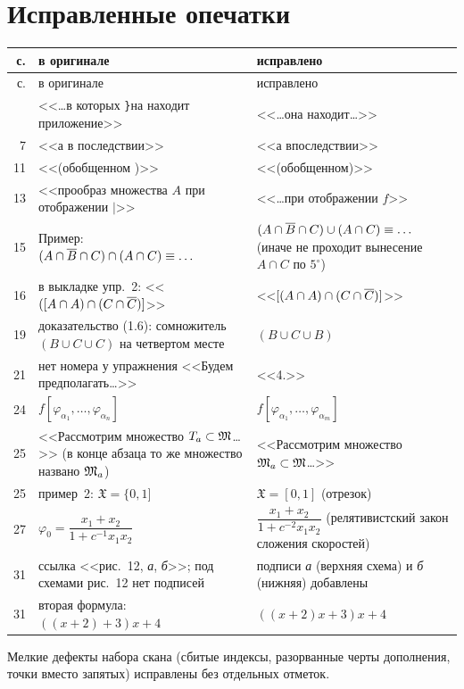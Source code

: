 \chapter{Исправленные опечатки}

{\small
\begin{longtable}{@{}r p{} p{}@{}}
\toprule
с. & в оригинале & исправлено\\ \midrule
\endfirsthead
\toprule
с. & в оригинале & исправлено\\ \midrule
\endhead
\bottomrule
\endlastfoot
3 & <<\dots в которых \texttt{\}}на находит приложение>> & <<\dots она находит\dots>>\\
7 & <<а в последствии>> & <<а впоследствии>>\\
11 & <<(обобщенном )>> & <<(обобщенном)>>\\
13 & <<прообраз множества $A$ при отображении $|$>> & <<\dots при отображении $f$>>\\
15 & Пример: $(A\cap\overline{B}\cap C)\cap(A\cap C)\equiv\dots$ & $(A\cap\overline{B}\cap C)\cup(A\cap C)\equiv\dots$ (иначе не проходит вынесение $A\cap C$ по $5^\circ$)\\
16 & в выкладке упр.~2: <<$([A\cap A)\cap(C\cap\overline{C})]$>> & <<$[(A\cap A)\cap(C\cap\overline{C})]$>>\\
19 & доказательство (1.6): сомножитель $(B\cup C\cup C)$ на четвертом месте & $(B\cup C\cup B)$\\
21 & нет номера у упражнения <<Будем предполагать\dots>> & <<4.>>\\
24 & $f[\varphi_{\alpha_1},\dots,\varphi_{\alpha_n}]$ & $f[\varphi_{\alpha_1},\dots,\varphi_{\alpha_m}]$\\
25 & <<Рассмотрим множество $T_a\subset\mathfrak M$\dots>> (в конце абзаца то же множество названо $\mathfrak M_a$) & <<Рассмотрим множество $\mathfrak M_a\subset\mathfrak M$\dots>>\\
25 & пример~2: $\mathfrak X=\{0,1]$ & $\mathfrak X=[0,1]$ (отрезок)\\
27 & $\varphi_0=\dfrac{x_1+x_2}{1+c^{-1}x_1x_2}$ & $\dfrac{x_1+x_2}{1+c^{-2}x_1x_2}$ (релятивистский закон сложения скоростей)\\
31 & ссылка <<рис.~12, \emph{а}, \emph{б}>>; под схемами рис.~12 нет подписей & подписи \emph{а} (верхняя схема) и \emph{б} (нижняя) добавлены\\
31 & вторая формула: $((x+2)+3)x+4$ & $((x+2)x+3)x+4$\\
\end{longtable}}

Мелкие дефекты набора скана (сбитые индексы, разорванные черты
дополнения, точки вместо запятых) исправлены без отдельных отметок.
